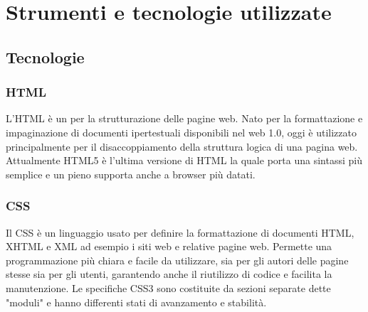 \begin{comment}
\section{Variazioni}
La creazione di test \g{test e2e} per l'applicazione \emph{mobile} è stata sposta alla quinta settimana per poter testare anche i flussi di conversazione implementati per la chat con Azzurra. I test \g{test e2e} per la parte \g{front-end},sono stati regolarmente svolti nella seconda settimana come pianificato. Non è stato possibile effettuare l'implementazione delle \glslink{notifica push}{notifiche push}\textcolor{SchoolColor}{\ap{[g]}} a causa di esigenze aziendali cioè, l'azienda aveva l'esigenza di avere già subito implementate le \glslink{notifica push}{notifiche push}\textcolor{SchoolColor}{\ap{[g]}}, cosi sono state implementante dai membri dell'azienda. L'attività è stata sostituita dall'attività di documentazione delle \glslink{notifica push}{notifiche push}\textcolor{SchoolColor}{\ap{[g]}}.
\end{comment}
\section{Strumenti e tecnologie utilizzate}

\subsection{Tecnologie}

\subsubsection*{HTML}
L'\gls{HTML} è un  per la strutturazione delle pagine web. Nato per la formattazione e impaginazione di documenti ipertestuali disponibili nel web 1.0, oggi è utilizzato principalmente per il disaccoppiamento della struttura logica di una pagina web. Attualmente \gls{HTML}5 è l'ultima versione di \gls{HTML} la quale porta una sintassi più semplice e un pieno supporta anche a browser più datati.

\subsubsection*{CSS}
Il \gls{CSS} è un linguaggio usato per definire la formattazione di documenti \gls{HTML}, \gls{XHTML} e \gls{XML} ad esempio i siti web e relative pagine web. Permette una programmazione più chiara e facile da utilizzare, sia per gli autori delle pagine stesse sia per gli utenti, garantendo anche il riutilizzo di codice e facilita la manutenzione. Le specifiche \gls{CSS}3 sono costituite da sezioni separate dette "moduli" e hanno differenti stati di avanzamento e stabilità.

